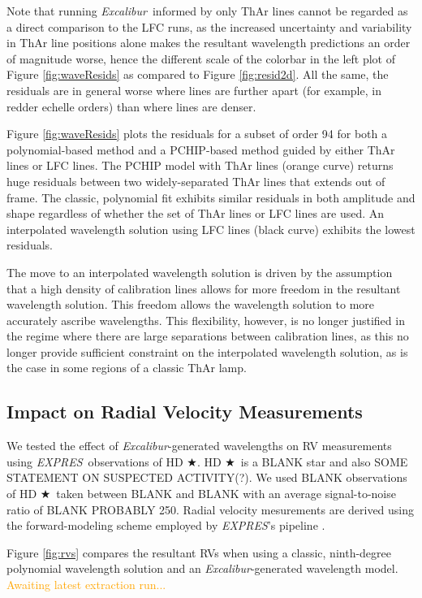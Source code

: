 \documentclass[modern]{aastex63}
\newcommand{\project}[1]{\textsl{#1}}
\newcommand{\name}{\project{Excalibur}}
\newcommand{\acronym}[1]{{\small{#1}}}
\newcommand{\expres}{\project{\acronym{EXPRES}}}
\newcommand{\target}{HD $\bigstar$}
\newcommand{\lz}[1]{\textcolor{orange}{#1}}
\begin{document}
Note that running \name\ informed by only ThAr lines cannot be regarded as a direct comparison to the LFC runs, as the increased uncertainty and variability in ThAr line positions alone makes the resultant wavelength predictions an order of magnitude worse, hence the different scale of the colorbar in the left plot of Figure \ref{fig:waveResids} as compared to Figure \ref{fig:resid2d}.  All the same, the residuals are in general worse where lines are further apart (for example, in redder echelle orders) than where lines are denser.

Figure \ref{fig:waveResids} plots the residuals for a subset of order 94 for both a polynomial-based method and a PCHIP-based method guided by either ThAr lines or LFC lines.   The PCHIP model with ThAr lines (orange curve) returns huge residuals between two widely-separated ThAr lines that extends out of frame.  The classic, polynomial fit exhibits similar residuals in both amplitude and shape regardless of whether the set of ThAr lines or LFC lines are used.  An interpolated wavelength solution using LFC lines (black curve) exhibits the lowest residuals.

The move to an interpolated wavelength solution is driven by the assumption that a high density of calibration lines allows for more freedom in the resultant wavelength solution.  This freedom allows the wavelength solution to more accurately ascribe wavelengths.  This flexibility, however, is no longer justified in the regime where there are large separations between calibration lines, as this no longer provide sufficient constraint on the interpolated wavelength solution, as is the case in some regions of a classic ThAr lamp.

\subsection{Impact on Radial Velocity Measurements}\label{sec:test-rv}
We tested the effect of \name -generated wavelengths on RV measurements using \expres\ observations of \target.  \target\ is a BLANK star and also SOME STATEMENT ON SUSPECTED ACTIVITY(?).  We used BLANK observations of \target\ taken between BLANK and BLANK with an average signal-to-noise ratio of BLANK PROBABLY 250.  Radial velocity mesurements are derived using the forward-modeling scheme employed by \expres's pipeline \citep{petersburg2020}.

Figure \ref{fig:rvs} compares the resultant RVs when using a classic, ninth-degree polynomial wavelength solution and an \name -generated wavelength model.
\lz{Awaiting latest extraction run...}
\end{document}
